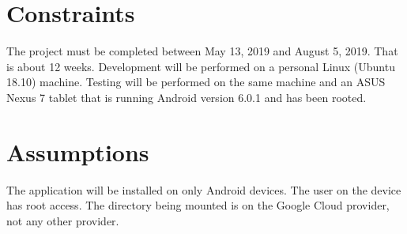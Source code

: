 \section{Constraints}
The project must be completed between May 13, 2019 and August 5, 2019. That is about 12 weeks. Development will be performed on a personal Linux (Ubuntu 18.10) machine. Testing will be performed on the same machine and an ASUS Nexus 7 tablet that is running Android version 6.0.1 and has been rooted.

\section{Assumptions}
The application will be installed on only Android devices. The user on the device has root access. The directory being mounted is on the Google Cloud provider, not any other provider.
